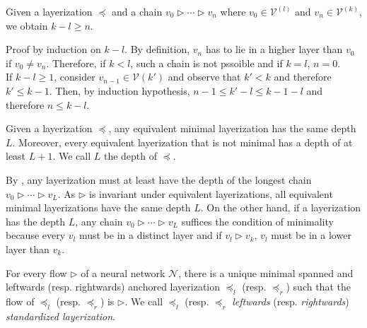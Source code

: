 \documentclass[a4paper,11pt]{report}
\begin{document}
\begin{Lem}\label{lem:depth}
Given a layerization $\preceq$ and a chain $v_0\triangleright\dotsb \triangleright v_n$ where $v_0\in\mathcal{V}^{(l)}$ and $v_n\in\mathcal{V}^{(k)}$, we obtain $k-l\ge n$.
\end{Lem}

\begin{Bew}
Proof by induction on $k-l$. By definition, $v_n$ has to lie in a higher layer than $v_0$ if $v_0\ne v_n$. Therefore, if $k<l$, such a chain is not pssoible and if $k=l$, $n=0$.\\
If $k-l\ge 1$, consider $v_{n-1}\in\mathcal{V}{(k')}$ and observe that $k'<k$ and therefore $k'\le k-1$. Then, by induction hypothesis, $n-1\le k'-l\le k-1-l$ and therefore $n\le k-l$. 
\end{Bew}

\begin{Pro}
Given a layerization $\preceq$, any equivalent minimal layerization has the same depth $L$. Moreover, every equivalent layerization that is not minimal has a depth of at least $L+1$. We call $L$ the depth of $\preceq$.
\end{Pro}

\begin{Bew}
By , any layerization must at least have the depth of the longest chain $v_0\triangleright\dotsb\triangleright v_L$. As $\triangleright$ is invariant under equivalent layerizations, all equivalent minimal layerizations have the same depth $L$. On the other hand, if a layerization has the depth $L$, any chain $v_0\triangleright\dotsb\triangleright v_L$ suffices the condition of minimality because every $v_l$ must be in a distinct layer and if $v_l\triangleright v_k$, $v_l$ must be in a lower layer than $v_k$.
\end{Bew}

\begin{The}\label{the:standardized-layerization}
For every flow $\triangleright$ of a neural network $\mathcal{N}$, there is a unique minimal spanned and leftwards (resp. rightwards) anchored layerization $\preceq_l$ (resp. $\preceq_r$) such that the flow of $\preceq_l$ (resp. $\preceq_r$) is $\triangleright$. We call $\preceq_l$ (resp. $\preceq_r$ \emph{leftwards} (resp. \emph{rightwards}) \emph{standardized layerization}.
\end{The}
\end{document}
